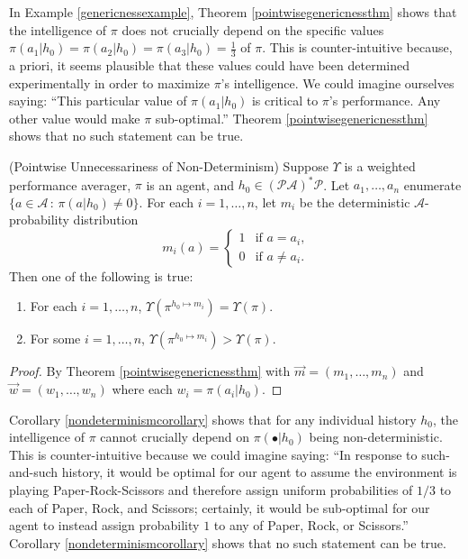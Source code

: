 \documentclass[runningheads]{llncs}
\begin{document}
In Example \ref{genericnessexample}, Theorem \ref{pointwisegenericnessthm} shows
that the intelligence of $\pi$ does not crucially depend on the specific values
$\pi(a_1|h_0)=\pi(a_2|h_0)=\pi(a_3|h_0)=\frac13$ of $\pi$.
This is counter-intuitive because, a priori, it seems
plausible that these values could have been determined
experimentally in order to maximize $\pi$'s intelligence. We could imagine ourselves
saying: ``This particular value of $\pi(a_1|h_0)$ is critical to $\pi$'s
performance. Any other value would make $\pi$ sub-optimal.''
Theorem \ref{pointwisegenericnessthm} shows that no such statement can be true.

\begin{corollary}
\label{nondeterminismcorollary}
    (Pointwise Unnecessariness of Non-Determinism)
    Suppose $\Upsilon$ is a weighted performance averager, $\pi$ is an agent,
    and $h_0\in(\mathcal P\mathcal A)^*\mathcal P$.
    Let $a_1,\ldots,a_n$ enumerate $\{a\in\mathcal A\,:\,\pi(a|h_0)\not=0\}$.
    For each $i=1,\ldots,n$, let $m_i$ be the
    deterministic $\mathcal A$-probability distribution
    \[
        m_i(a) = \begin{cases}
            1 &\mbox{if $a=a_i$,}\\
            0 &\mbox{if $a\not=a_i$.}
        \end{cases}
    \]
    Then one of the following is true:
    \begin{enumerate}
        \item
        For each $i=1,\ldots,n$, $\Upsilon(\pi^{h_0\mapsto m_i})=\Upsilon(\pi)$.
        \item
        For some $i=1,\ldots,n$, $\Upsilon(\pi^{h_0\mapsto m_i})>\Upsilon(\pi)$.
    \end{enumerate}
\end{corollary}

\begin{proof}
    By Theorem \ref{pointwisegenericnessthm} with
    $\vec m=(m_1,\ldots,m_n)$ and $\vec w=(w_1,\ldots,w_n)$ where each
    $w_i=\pi(a_i|h_0)$.
\end{proof}

Corollary \ref{nondeterminismcorollary} shows that for any individual
history $h_0$, the intelligence of $\pi$ cannot crucially depend on $\pi(\bullet|h_0)$
being non-deterministic. This is counter-intuitive because we could imagine saying:
``In response to such-and-such history, it would be optimal for our agent
to assume the environment is playing Paper-Rock-Scissors and therefore
assign uniform probabilities of $1/3$ to each of Paper, Rock, and Scissors;
certainly, it would be sub-optimal for our agent to instead assign probability $1$ to
any of Paper, Rock, or Scissors.'' Corollary \ref{nondeterminismcorollary} shows
that no such statement can be true.
\end{document}
